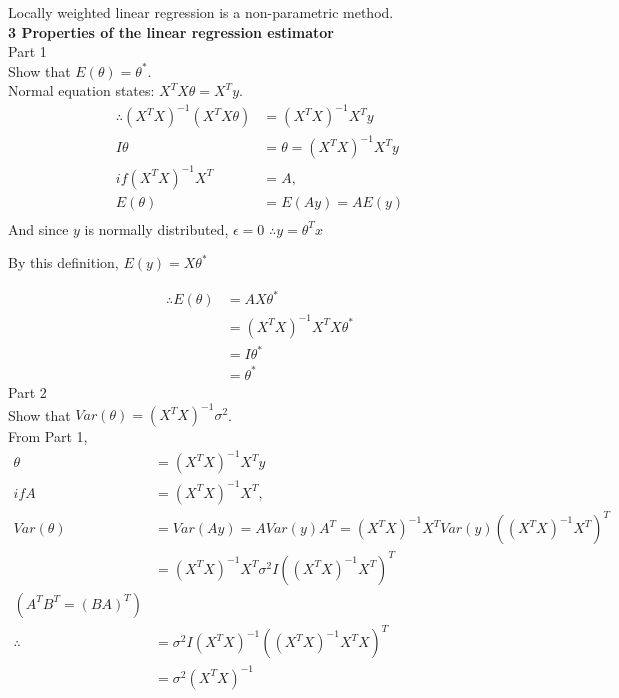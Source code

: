 \documentclass[12pt]{article}
\begin{document}
	
	Locally weighted linear regression is a non-parametric method.\\
	
	
	\noindent \textbf{3 Properties of the linear regression estimator} \\
	\noindent Part 1\\
	\indent Show that $E(\theta) = \theta^{*}$.\\
	\indent Normal equation states:
	$X^{T}X\theta = X^{T}y.$\\
	\begin{align*}
	\therefore
	(X^{T}X)^{-1}(X^{T}X\theta) &= (X^{T}X)^{-1}X^{T}y\\
	I\theta &= \theta = (X^{T}X)^{-1}X^{T}y\\
	if (X^{T}X)^{-1}X^{T} &= A,	\\
	E(\theta) &= E(Ay) = AE(y)\\
	\end{align*}
 	\indent And since $y$ is normally distributed, $\epsilon = 0$ \indent $ \therefore y = \theta^{T}x$\\
 	\begin{center}
	By this definition, $E(y) = X\theta^{*}$\\
	\end{center}
	\begin{align*}	
	\therefore E(\theta) &= AX\theta^{*}\\
	&= (X^{T}X)^{-1}X^{T}X\theta^{*}\\
	&= I\theta^{*}\\
	&= \theta^{*}
	\end{align*}
	\noindent Part 2\\
	\indent Show that $Var(\theta) = (X^{T}X)^{-1}\sigma^{2}$.\\
	\indent From Part 1, 
	\begin{align*}
	\theta &= (X^{T}X)^{-1}X^{T}y\\
	if A &= (X^{T}X)^{-1}X^{T},	\\
	Var(\theta) &= Var(Ay) = AVar(y)A^{T} = (X^{T}X)^{-1}X^{T}Var(y)((X^{T}X)^{-1}X^{T})^{T}\\
	&= (X^{T}X)^{-1}X^{T}\sigma^{2}I((X^{T}X)^{-1}X^{T})^{T}\\
	(A^{T}B^{T} = (BA)^{T})	\\
	\therefore	&= \sigma^{2}I (X^{T}X)^{-1}((X^{T}X)^{-1}X^{T}X)^{T}\\
	&= \sigma^{2}(X^{T}X)^{-1}
	\end{align*}
\end{document}

